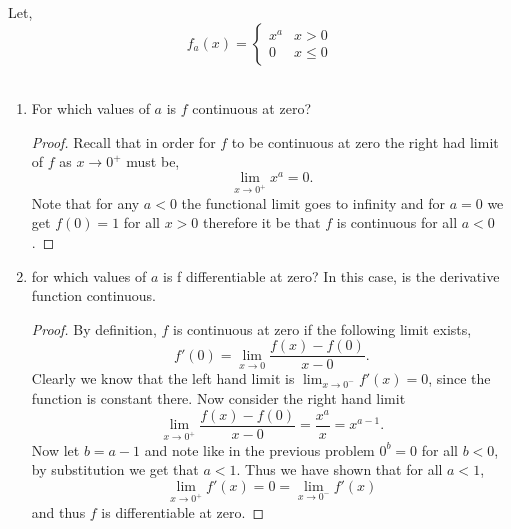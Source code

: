 \documentclass[12pt]{article}
\makeatletter
\theoremstyle{homework}
\newenvironment{exercise}[1]
{\def\@currentlabel{#1}\exercisecore}
{\endexercisecore}
\makeatother
\begin{document}
\begin{exercise}{Abbott 5.2.5} Let,
  \begin{equation*}
   f_{a}(x) =  \begin{cases} 
      x^a & x > 0 \\
      0 & x \le 0 
   \end{cases}
  \end{equation*}\\
  \begin{enumerate}
    \item For which values of $a$ is $f$ continuous at zero?\\
    \begin{proof}
      Recall that in order for $f$ to be continuous at zero the right had limit of $f$ as $x \to 0^+$ must be,
      \begin{equation*}
        \lim_{x\to 0^+} x^a = 0.
      \end{equation*}
      Note that for any $a < 0$ the functional limit goes to infinity and for $a = 0$ we get $f(0) = 1$ for all $x > 0$
      therefore it be that $f$ is continuous for all $a < 0$.
    \end{proof}
    \vspace{.25in}

    \item for which values of $a$ is f differentiable at zero? In this case, is the derivative function continuous.\\
    \begin{proof}
      By definition, $f$ is continuous at zero if the following limit exists,
      \begin{equation*}
        f'(0) = \lim_{x \to 0} \dfrac{f(x) - f(0)}{x - 0}. 
      \end{equation*}
    Clearly we know that the left hand limit is $\lim_{x\to 0^-} f'(x) = 0$, since the function is constant there. Now consider the right hand limit
    \begin{equation*}
      \lim_{x \to 0^+} \dfrac{f(x) - f(0)}{x - 0} = \dfrac{x^a}{x} = x^{a-1}. 
    \end{equation*}
      Now let $b = a-1$ and note like in the previous problem $0^b = 0$ for all $b<0$, by substitution we get that $a<1$.
      Thus we have shown that for all $a <1$,
      \begin{equation*}
        \lim_{x \to 0^+} f'(x)  = 0  = \lim_{x\to 0^-} f'(x) 
      \end{equation*}
      and thus $f$ is differentiable at zero. 
    \end{proof}
    \vspace{.25in}



\end{enumerate}
\end{exercise}
\end{document}
